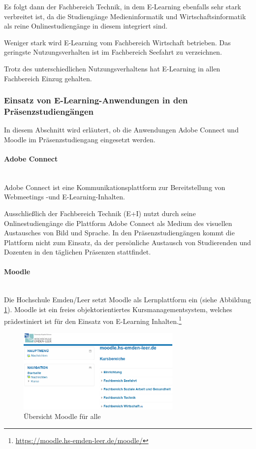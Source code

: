 Es folgt dann der Fachbereich Technik, in dem E-Learning ebenfalls sehr stark verbreitet ist, da die Studiengänge Medieninformatik und Wirtschaftsinformatik als reine Onlinestudiengänge in diesem integriert sind.

Weniger stark wird E-Learning vom Fachbereich Wirtschaft betrieben. Das geringste Nutzungsverhalten ist im Fachbereich Seefahrt zu verzeichnen.

Trotz des unterschiedlichen Nutzungsverhaltens hat E-Learning in allen Fachbereich Einzug gehalten.

\subsubsection[Einsatz von E-Learning-Anwendungen]{Einsatz von E-Learning-Anwendungen in den Präsenzstudiengängen}
In diesem Abschnitt wird erläutert, ob die Anwendungen Adobe Connect und Moodle im Präsenzstudiengang eingesetzt werden.

\paragraph{Adobe Connect}\mbox{} \\

Adobe Connect ist eine Kommunikationsplattform zur Bereitstellung von Webmeetings -und E-Learning-Inhalten.

Ausschließlich der Fachbereich Technik (E+I) nutzt durch seine Onlinestudiengänge die Plattform Adobe Connect als Medium des visuellen Austausches von Bild und Sprache. In den Präsenzstudiengängen kommt die Plattform nicht zum Einsatz, da der persönliche Austausch von Studierenden und Dozenten in den täglichen Präsenzen stattfindet.

\paragraph{Moodle}\mbox{} \\

\label{paragraph_moodle}
Die Hochschule Emden/Leer setzt Moodle als Lernplattform ein (siehe Abbildung \ref{fig_moodle}). Moodle ist ein freies objektorientiertes Kursmanagementsystem, welches prädestiniert ist für den Einsatz von E-Learning Inhalten.\footnote{\url{https://moodle.hs-emden-leer.de/moodle/}}

\begin{figure}[h!]
	\centering
	\includegraphics[width=8cm]{kapitel/gruppe2/bilder/moodle}
	\caption{Übersicht Moodle für alle}
	\label{fig_moodle}
\end{figure}

